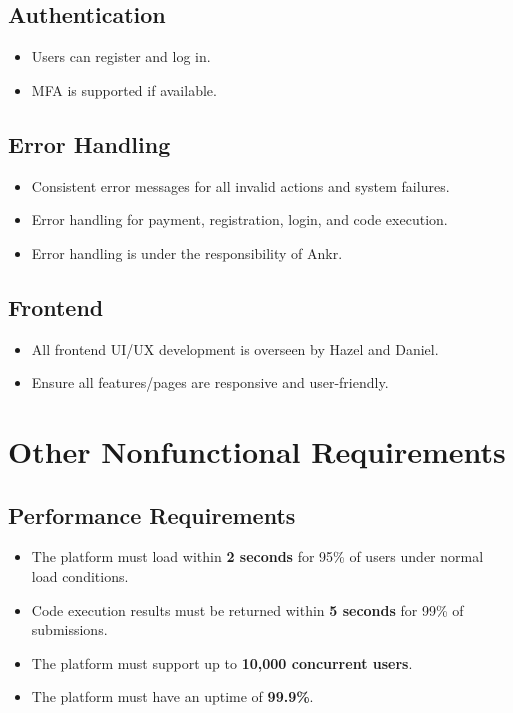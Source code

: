\documentclass[a4paper, 11pt]{scrreprt}
\begin{document}
\section{Authentication}

\begin{itemize}
    \item Users can register and log in.
    \item MFA is supported if available.
\end{itemize}

\section{Error Handling}
\begin{itemize}
    \item Consistent error messages for all invalid actions and system failures.
    \item Error handling for payment, registration, login, and code execution.
    \item Error handling is under the responsibility of Ankr.
\end{itemize}

\section{Frontend}
\begin{itemize}
    \item All frontend UI/UX development is overseen by Hazel and Daniel.
    \item Ensure all features/pages are responsive and user-friendly.
\end{itemize}

\chapter{Other Nonfunctional Requirements}

\section{Performance Requirements}
\begin{itemize}
    \item The platform must load within \textbf{2 seconds} for 95\% of users under normal load conditions.
    \item Code execution results must be returned within \textbf{5 seconds} for 99\% of submissions.
    \item The platform must support up to \textbf{10,000 concurrent users}.
    \item The platform must have an uptime of \textbf{99.9\%}.
\end{itemize}
\end{document}
